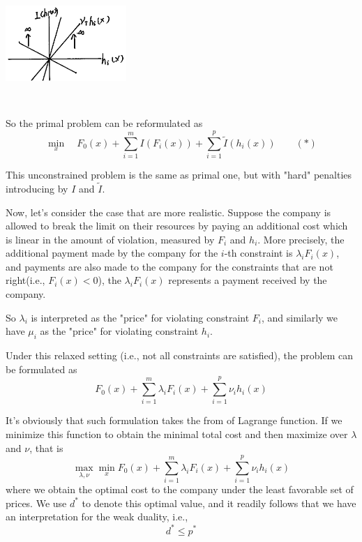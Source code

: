 \begin{marginfigure}
	\centering
	\includegraphics[width=1.8in,height=1.8in]{figures/ch10/figure1127_3.png}
\end{marginfigure}

So the primal problem can be reformulated as 
$$\min_x\quad F_0(x) + \sum^m_{i=1}I(F_i(x)) + \sum^p_{i=1}\tilde{I}(h_i(x)) \qquad (*)$$

This unconstrained problem is the same as primal one, but with "hard" penalties introducing by $I$ and $\tilde{I}$.

Now, let's consider the case that are more realistic. Suppose the company is allowed to break the limit on their resources by paying an additional cost which is linear in the amount of violation, measured by $F_i$ and $h_i$. More precisely, the additional payment made by the company for the $i$-th constraint is $\lambda_i F_i(x)$, and payments are also made to the company for the constraints that are not right(i.e., $F_i(x)<0$), the $\lambda_i F_i(x)$ represents a payment received by the company. 

So $\lambda_i$ is interpreted as the "price" for violating constraint $F_i$, and similarly we have $\mu_i$ as the "price" for violating constraint $h_i$.

Under this relaxed setting (i.e., not all constraints are satisfied), the problem can be formulated as 
$$F_0(x) + \sum^m_{i=1}\lambda_i F_i(x) + \sum^p_{i=1}\nu_i h_i(x)$$

It's obviously that such formulation takes the from of Lagrange function. If we minimize this function to obtain the minimal total cost and then maximize over $\lambda$ and $\nu$, that is
$$\max_{\lambda, \nu} \min_x F_0(x) + \sum^m_{i=1}\lambda_i F_i(x) + \sum^p_{i=1}\nu_i h_i(x)$$
where we obtain the optimal cost to the company under the least favorable set of prices. We use $d^*$ to denote this optimal value, and it readily follows that we have an interpretation for the weak duality, i.e.,
$$d^* \leq p^*$$


